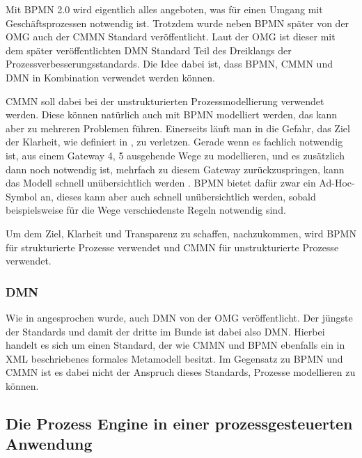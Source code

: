 \label{par:dreiklang_prozessverbesserungsstandards}
Mit \ac{BPMN} 2.0 wird eigentlich alles angeboten, was für einen Umgang mit Geschäftsprozessen notwendig ist. Trotzdem wurde neben \ac{BPMN} später von der \ac{OMG} auch der \ac{CMMN} Standard veröffentlicht. Laut der \ac{OMG} ist dieser mit dem später veröffentlichten \ac{DMN} Standard Teil des Dreiklangs der Prozessverbesserungsstandards. Die Idee dabei ist, dass \ac{BPMN}, \ac{CMMN} und \ac{DMN} in Kombination verwendet werden können. \citep{object_management_group_case_2016}

\ac{CMMN} soll dabei bei der unstrukturierten Prozessmodellierung verwendet werden. Diese können natürlich auch mit \ac{BPMN} modelliert werden, das kann aber zu mehreren Problemen führen. Einerseits läuft man in die Gefahr, das Ziel der Klarheit, wie definiert in , zu verletzen. Gerade wenn es fachlich notwendig ist, aus einem Gateway 4, 5 ausgehende Wege zu modellieren, und es zusätzlich dann noch notwendig ist, mehrfach zu diesem Gateway zurückzuspringen, kann das Modell schnell unübersichtlich werden \citep[vgl.][S. 9]{freund_praxishandbuch_2017}. \ac{BPMN} bietet dafür zwar ein Ad-Hoc-Symbol an, dieses kann aber auch schnell unübersichtlich werden, sobald beispielsweise für die Wege verschiedenste Regeln notwendig sind. 

Um dem Ziel, Klarheit und Transparenz zu schaffen, nachzukommen, wird \ac{BPMN} für strukturierte Prozesse verwendet und \ac{CMMN} für unstrukturierte Prozesse verwendet. \citep[vgl.][S. 5]{bruce_bpmn_2012}

\subsubsection{\acl{DMN}}

Wie in  angesprochen wurde, auch \acl{DMN} von der \ac{OMG} veröffentlicht. Der jüngste der Standards und damit der dritte im Bunde ist dabei also \ac{DMN}. Hierbei handelt es sich um einen Standard, der wie \ac{CMMN} und \ac{BPMN} ebenfalls ein in XML beschriebenes formales Metamodell besitzt. Im Gegensatz zu \ac{BPMN} und \ac{CMMN} ist es dabei nicht der Anspruch dieses Standards, Prozesse modellieren zu können. \citep[vgl.][S. 10f]{freund_praxishandbuch_2017}  

\clearpage
\subsection{Die Prozess Engine in einer prozessgesteuerten Anwendung}
